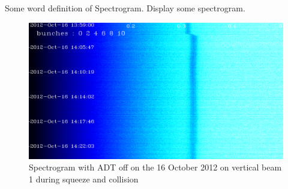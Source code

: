 Some word definition of Spectrogram. Display some spectrogram.

\begin{figure}[H]
	\caption{Spectrogram with ADT off on the 16 October 2012 on vertical beam 1 during squeeze and collision}
	\centering
	\includegraphics[scale=0.3]{md-121016-vb1-m1-6bunches-10acc-1359-1425-collision.pdf}
\end{figure}